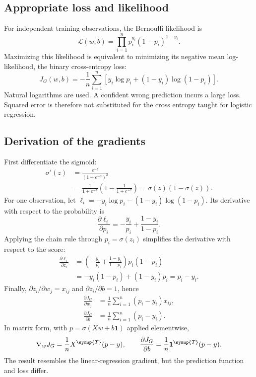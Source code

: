 \subsection{Appropriate loss and likelihood}
For independent training observations, the Bernoulli likelihood is
\[
\mathcal L(w,b)=\prod_{i=1}^{n}p_i^{y_i}(1-p_i)^{1-y_i}.
\]
Maximizing this likelihood is equivalent to minimizing its negative mean log-likelihood, the binary cross-entropy loss:
\[
J_G(w,b)=-\frac1n\sum_{i=1}^{n}\left[y_i\log p_i+(1-y_i)\log(1-p_i)\right].
\]
Natural logarithms are used. A confident wrong prediction incurs a large loss. Squared error is therefore not substituted for the cross entropy taught for logistic regression.

\subsection{Derivation of the gradients}
First differentiate the sigmoid:
\[
\begin{aligned}
\sigma'(z)&=\frac{e^{-z}}{(1+e^{-z})^2}\\
 &=\frac1{1+e^{-z}}\left(1-\frac1{1+e^{-z}}\right)
 =\sigma(z)(1-\sigma(z)).
\end{aligned}
\]
For one observation, let $\ell_i=-y_i\log p_i-(1-y_i)\log(1-p_i)$. Its derivative with respect to the probability is
\[
\frac{\partial\ell_i}{\partial p_i}
 =-\frac{y_i}{p_i}+\frac{1-y_i}{1-p_i}.
\]
Applying the chain rule through $p_i=\sigma(z_i)$ simplifies the derivative with respect to the score:
\[
\begin{aligned}
\frac{\partial\ell_i}{\partial z_i}
 &=\left(-\frac{y_i}{p_i}+\frac{1-y_i}{1-p_i}\right)p_i(1-p_i)\\
 &=-y_i(1-p_i)+(1-y_i)p_i=p_i-y_i.
\end{aligned}
\]
Finally, $\partial z_i/\partial w_j=x_{ij}$ and $\partial z_i/\partial b=1$, hence
\[
\begin{aligned}
\frac{\partial J_G}{\partial w_j}&=\frac1n\sum_{i=1}^{n}(p_i-y_i)x_{ij},\\
\frac{\partial J_G}{\partial b}&=\frac1n\sum_{i=1}^{n}(p_i-y_i).
\end{aligned}
\]
In matrix form, with $p=\sigma(Xw+b\mathbf1)$ applied elementwise,
\[
\nabla_wJ_G=\frac1nX^{\symup{T}}(p-y),\qquad
\frac{\partial J_G}{\partial b}=\frac1n\mathbf1^{\symup{T}}(p-y).
\]
The result resembles the linear-regression gradient, but the prediction function and loss differ.


